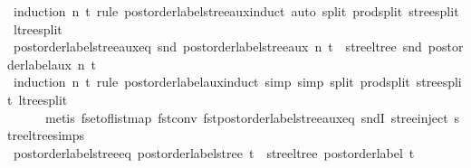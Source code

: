 \begin{isabellebody}
\ {\isacharparenleft}{\kern0pt}induction\ n\ t\ rule{\isacharcolon}{\kern0pt}\ postorder{\isacharunderscore}{\kern0pt}label{\isacharunderscore}{\kern0pt}stree{\isacharunderscore}{\kern0pt}aux{\isachardot}{\kern0pt}induct{\isacharparenright}{\kern0pt}\ {\isacharparenleft}{\kern0pt}auto\ split{\isacharcolon}{\kern0pt}\ prod{\isachardot}{\kern0pt}split\ stree{\isachardot}{\kern0pt}split\ ltree{\isachardot}{\kern0pt}split{\isacharparenright}{\kern0pt}%
\endisatagproof
{\isafoldproof}%
%
\isadelimproof
\isanewline
%
\endisadelimproof
\isanewline
{}\isamarkupfalse%
\ postorder{\isacharunderscore}{\kern0pt}label{\isacharunderscore}{\kern0pt}stree{\isacharunderscore}{\kern0pt}aux{\isacharunderscore}{\kern0pt}eq{\isacharcolon}{\kern0pt}\ {\isachardoublequoteopen}snd\ {\isacharparenleft}{\kern0pt}postorder{\isacharunderscore}{\kern0pt}label{\isacharunderscore}{\kern0pt}stree{\isacharunderscore}{\kern0pt}aux\ n\ t{\isacharparenright}{\kern0pt}\ {\isacharequal}{\kern0pt}\ stree{\isacharunderscore}{\kern0pt}ltree\ {\isacharparenleft}{\kern0pt}snd\ {\isacharparenleft}{\kern0pt}postorder{\isacharunderscore}{\kern0pt}label{\isacharunderscore}{\kern0pt}aux\ n\ t{\isacharparenright}{\kern0pt}{\isacharparenright}{\kern0pt}{\isachardoublequoteclose}\isanewline
%
\isadelimproof
\ \ %
\endisadelimproof
%
\isatagproof
{}\isamarkupfalse%
\ {\isacharparenleft}{\kern0pt}induction\ n\ t\ rule{\isacharcolon}{\kern0pt}\ postorder{\isacharunderscore}{\kern0pt}label{\isacharunderscore}{\kern0pt}aux{\isachardot}{\kern0pt}induct{\isacharparenright}{\kern0pt}\ {\isacharparenleft}{\kern0pt}simp{\isacharcomma}{\kern0pt}\ simp\ split{\isacharcolon}{\kern0pt}\ prod{\isachardot}{\kern0pt}split\ stree{\isachardot}{\kern0pt}split\ ltree{\isachardot}{\kern0pt}split{\isacharcomma}{\kern0pt}\isanewline
\ \ \ \ \ \ metis\ fset{\isacharunderscore}{\kern0pt}of{\isacharunderscore}{\kern0pt}list{\isacharunderscore}{\kern0pt}map\ fst{\isacharunderscore}{\kern0pt}conv\ fst{\isacharunderscore}{\kern0pt}postorder{\isacharunderscore}{\kern0pt}label{\isacharunderscore}{\kern0pt}stree{\isacharunderscore}{\kern0pt}aux{\isacharunderscore}{\kern0pt}eq\ sndI\ stree{\isachardot}{\kern0pt}inject\ stree{\isacharunderscore}{\kern0pt}ltree{\isachardot}{\kern0pt}simps{\isacharparenright}{\kern0pt}%
\endisatagproof
{\isafoldproof}%
%
\isadelimproof
\isanewline
%
\endisadelimproof
\isanewline
{}\isamarkupfalse%
\ postorder{\isacharunderscore}{\kern0pt}label{\isacharunderscore}{\kern0pt}stree{\isacharunderscore}{\kern0pt}eq{\isacharcolon}{\kern0pt}\ {\isachardoublequoteopen}postorder{\isacharunderscore}{\kern0pt}label{\isacharunderscore}{\kern0pt}stree\ t\ {\isacharequal}{\kern0pt}\ stree{\isacharunderscore}{\kern0pt}ltree\ {\isacharparenleft}{\kern0pt}postorder{\isacharunderscore}{\kern0pt}label\ t{\isacharparenright}{\kern0pt}{\isachardoublequoteclose}\isanewline

\end{isabellebody}
